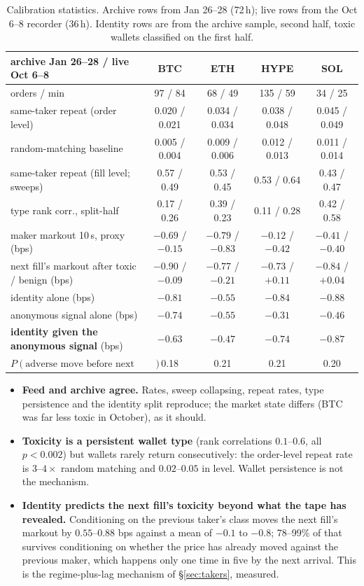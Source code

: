 \documentclass[11pt]{article}
\begin{document}
\begin{table}[h]\footnotesize\centering
\begin{tabular}{lcccc}
\toprule
archive Jan 26--28 / live Oct 6--8 & BTC & ETH & HYPE & SOL \\
\midrule
orders / min & 97 / 84 & 68 / 49 & 135 / 59 & 34 / 25 \\
same-taker repeat (order level) & 0.020 / 0.021 & 0.034 / 0.034 & 0.038 / 0.048 & 0.045 / 0.049 \\
\quad random-matching baseline & 0.005 / 0.004 & 0.009 / 0.006 & 0.012 / 0.013 & 0.011 / 0.014 \\
same-taker repeat (fill level; sweeps) & 0.57 / 0.49 & 0.53 / 0.45 & 0.53 / 0.64 & 0.43 / 0.47 \\
type rank corr., split-half & 0.17 / 0.26 & 0.39 / 0.23 & 0.11 / 0.28 & 0.42 / 0.58 \\
maker markout 10\,s, proxy (bps) & $-0.69$ / $-0.15$ & $-0.79$ / $-0.83$ & $-0.12$ / $-0.42$ & $-0.41$ / $-0.40$ \\
next fill's markout after toxic / benign (bps) & $-0.90$ / $-0.09$ & $-0.77$ / $-0.21$ & $-0.73$ / $+0.11$ & $-0.84$ / $+0.04$ \\
identity alone (bps) & $-0.81$ & $-0.55$ & $-0.84$ & $-0.88$ \\
anonymous signal alone (bps) & $-0.74$ & $-0.55$ & $-0.31$ & $-0.46$ \\
\textbf{identity given the anonymous signal} (bps) & $\mathbf{-0.63}$ & $\mathbf{-0.47}$ & $\mathbf{-0.74}$ & $\mathbf{-0.87}$ \\
$P(\text{adverse move before next order})$ & 0.18 & 0.21 & 0.21 & 0.20 \\
\bottomrule
\end{tabular}
\caption{Calibration statistics. Archive rows from Jan 26--28 (72\,h); live rows from the Oct 6--8 recorder (36\,h). Identity rows are from the archive sample, second half, toxic wallets classified on the first half.}\label{tab:calib}
\end{table}

\begin{itemize}
\item \textbf{Feed and archive agree.} Rates, sweep collapsing, repeat rates, type persistence and the identity split reproduce; the market state differs (BTC was far less toxic in October), as it should.
\item \textbf{Toxicity is a persistent wallet type} (rank correlations $0.1$--$0.6$, all $p<0.002$) but wallets rarely return consecutively: the order-level repeat rate is $3$--$4\times$ random matching and $0.02$--$0.05$ in level. Wallet persistence is not the mechanism.
\item \textbf{Identity predicts the next fill's toxicity beyond what the tape has revealed.} Conditioning on the previous taker's class moves the next fill's markout by $0.55$--$0.88$ bps against a mean of $-0.1$ to $-0.8$; 78--99\% of that survives conditioning on whether the price has already moved against the previous maker, which happens only one time in five by the next arrival. This is the regime-plus-lag mechanism of \S\ref{sec:takers}, measured.
\end{itemize}
\end{document}
